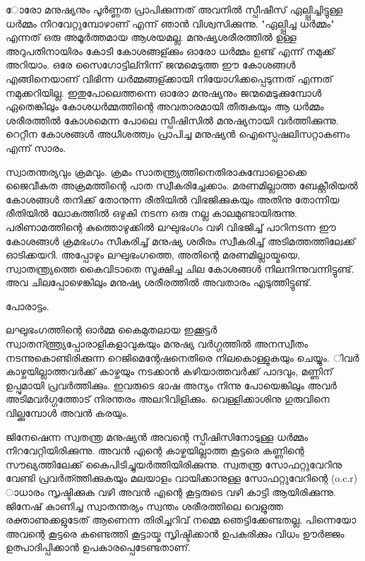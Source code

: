 \newpage
{}
ോരോ മനുഷ്യനും പൂര്‍ണ്ണത പ്രാപിക്കുന്നത് അവനില്‍ സ്പീഷീസ് ഏല്പ്പിച്ചിട്ടുള്ള ധര്‍മ്മം നിറവേറ്റുമ്പോഴാണ് എന്ന് ഞാന്‍ വിശ്വസിക്കുന്നു. "ഏല്പ്പിച്ച ധര്‍മ്മം" എന്നത് ഒരു അമൂര്‍ത്തമായ ആശയമല്ല. മനുഷ്യശരീരത്തില്‍ ഉള്ള അറുപതിനായിരം കോടി കോശങ്ങള്ക്കും ഓരോ ധര്‍മ്മം ഉണ്ട് എന്ന് നമുക്ക് അറിയാം. ഒരേ സൈഗോട്ടില്നിന്ന് ജന്മമെടുത്ത ഈ കോശങ്ങള്‍ എങ്ങിനെയാണ്
വിഭിന്ന ധര്‍മ്മങ്ങള്ക്കായി നിയോഗിക്കപ്പെടുന്നത് എന്നത് നമുക്കറിയില്ല. ഇതുപോലെത്തന്നെ ഓരോ മനുഷ്യനും ജന്മമെടുക്കുമ്പോള്‍ ഏതെങ്കിലും കോശധര്‍മ്മത്തിന്റെ അവതാരമായി തീരുകയും ആ ധര്‍മ്മം ശരീരത്തില്‍ കോശമെന്ന പോലെ സ്പീഷിസില്‍ മനുഷ്യനായി
വര്‍ത്തിക്കുന്നു. റെറ്റീന കോശങ്ങള്‍ അധീശത്ത്വം പ്രാപിച്ച മനുഷ്യന്‍ ഐസ്പെഷലിസറ്റാകണം എന്ന് സാരം.

സ്വാതന്തര്യവും ക്രമവും. ക്രമം സാതന്ത്ര്യത്തിനെതിരാകുമ്പോളൊക്കെ ജൈവീകത അക്രമത്തിന്റെ പാത സ്വീകരിച്ചേക്കാം. മരണമില്ലാത്ത ബേക്റ്റീരിയല്‍ കോശങ്ങള്‍ തനിക്ക് തോനുന്ന രീതിയില്‍ വിഭജിക്കുകയും അതിനു തോന്നിയ രീതിയില്‍ ലോകത്തില്‍ ഒഴുകി നടന്ന ഒരു നല്ല കാലമുണ്ടായിരുന്നു. പരിണാമത്തിന്റെ കുത്തൊഴുക്കില്‍ ലഘുഭംഗം വഴി വിഭജിച്ച് പാറിനടന്ന ഈ കോശങ്ങള്‍ ക്രമഭംഗം സീകരിച്ച് മനുഷ്യ
ശരീരം സ്വീകരിച്ച് അടിമത്തത്തിലേക്ക് ഓടിക്കയറി. അപ്പോഴും ലഘുഭംഗത്തെ, അതിന്റെ മരണമില്ലായ്മയെ, സ്വാതന്ത്ര്യത്തെ കൈവിടാതെ സൂക്ഷിച്ച ചില കോശങ്ങള്‍ നിലനിന്നുവന്നിട്ടുണ്ട്. അവ ചിലപ്പോഴെങ്കിലും മനുഷ്യ ശരീരത്തില്‍ അവതാരം എടുത്തിട്ടുണ്ട്.


പോരാട്ടം.

ലഘുഭംഗത്തിന്റെ ഓര്‍മ്മ കൈമുതലായ ഇക്കൂട്ടര്‍ സ്വാതന്ത്ത്ര്യപ്പോരാളികളാവുകയും മനുഷ്യ വര്‍ഗ്ഗത്തില്‍ അനസ്വീതം നടന്നുകൊണ്ടിരിക്കുന്ന റെജിമെന്റേഷനെതിരെ നിലകൊള്ളുകയും ചെയ്യും.
ിവര്‍ കാഴ്ചയില്ലാത്തവര്‍ക്ക് കാഴ്ചയും നടക്കാന്‍ കഴിയാത്തവര്‍ക്ക് പാദവും, മണ്ണിന് ഉപ്പുമായി പ്രവര്‍ത്തിക്കും. ഇവരുടെ ഭാഷ അന്യം നിന്നു പോയെങ്കിലും
അവര്‍ അടിമവര്‍ഗ്ഗത്തോട് നിരന്തരം അലറിവിളിക്കും. വെള്ളിക്കാശിനു ഗുരുവിനെ വില്ക്കുമ്പോള്‍ അവന്‍ കരയും.

ജിനേഷെന്ന സ്വതന്ത്ര മനുഷ്യന്‍ അവന്റെ സ്പീഷിസിനോടുള്ള ധര്‍മ്മം നിറവേറ്റിയിരിക്കുന്നു. അവന്‍ എന്റെ കാഴ്ചയില്ലാത്ത കൂട്ടരെ കണ്ണിന്റെ സൗഖ്യത്തിലേക്ക് കൈപിടിച്ചുയര്‍ത്തിയിരിക്കുന്നു. സ്വതന്ത്ര സോഫറ്റുവേറിനു വേണ്ടി പ്രവര്‍ത്ത്തിക്കുകയും മലയാളം വായിക്കാനുള്ള സോഫറ്റുവേറിന്റെ (o.c.r) ാധാരം സൃഷ്ടിക്കുക വഴി അവന്‍ എന്റെ കൂട്ടരുടെ വഴി കാട്ടി ആയിരിക്കുന്നു.
ജിനേഷ് കാണിച്ച സ്വാതന്തര്യം സ്വന്തം ശരീരത്തിലെ വെളുത്ത രക്താണുക്കളുടേത് ആണെന്ന തിരിച്ചറിവ് നമ്മെ ഞെട്ടിക്കേണ്ടതല്ല, പിന്നെയോ അവന്റെ കൂട്ടരെ കണ്ടെത്തി കൂട്ടായ്മ സൃിഷ്ടിക്കാന്‍ ഉപകരിക്കും
വിധം ഊര്‍ജ്ജം ഉത്പാദിപ്പിക്കാന്‍ ഉപകാരപ്പെടേണ്ടതാണ്.
\newpage
